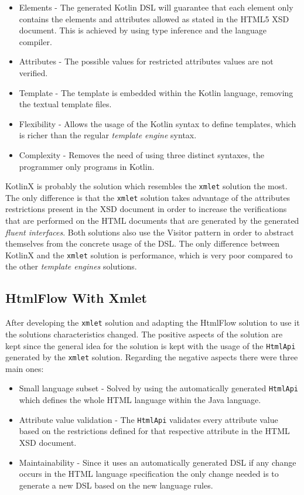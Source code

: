 \begin{itemize}
	\item Elements - The generated Kotlin \ac{DSL} will guarantee that each element only contains the elements and attributes allowed as stated in the \ac{HTML}5 \ac{XSD} document. This is achieved by using type inference and the language compiler.
	\item Attributes - The possible values for restricted attributes values are not verified.
	\item Template - The template is embedded within the Kotlin language, removing the textual template files.
	\item Flexibility - Allows the usage of the Kotlin syntax to define templates, which is richer than the regular \textit{template engine} syntax.
	\item Complexity - Removes the need of using three distinct syntaxes, the programmer only programs in Kotlin.
\end{itemize}

\noindent
KotlinX\cite{kotlinx} is probably the solution which resembles the \texttt{xmlet} solution the most. The only difference is that the \texttt{xmlet} solution takes advantage of the attributes restrictions present in the \ac{XSD} document in order to increase the verifications that are performed on the \ac{HTML} documents that are generated by the generated \textit{fluent interfaces}. Both solutions also use the Visitor pattern in order to abstract themselves from the concrete usage of the \ac{DSL}. The only difference between KotlinX and the \texttt{xmlet} solution is performance, which is very poor compared to the other \textit{template engines} solutions.

\subsection{HtmlFlow With Xmlet}
\label{sec:htmlflowwithxmlet}

After developing the \texttt{xmlet} solution and adapting the HtmlFlow solution to use it the solutions characteristics changed. The positive aspects of the solution are kept since the general idea for the solution is kept with the usage of the \texttt{HtmlApi} generated by the \texttt{xmlet} solution. Regarding the negative aspects there were three main ones:

\begin{itemize}
	\item Small language subset - Solved by using the automatically generated \texttt{HtmlApi} which defines the whole \ac{HTML} language within the Java language.
	\item Attribute value validation - The \texttt{HtmlApi} validates every attribute value based on the restrictions defined for that respective attribute in the \ac{HTML} \ac{XSD} document.
	\item Maintainability - Since it uses an automatically generated \ac{DSL} if any change occurs in the \ac{HTML} language specification the only change needed is to generate a new \ac{DSL} based on the new language rules.
\end{itemize}

